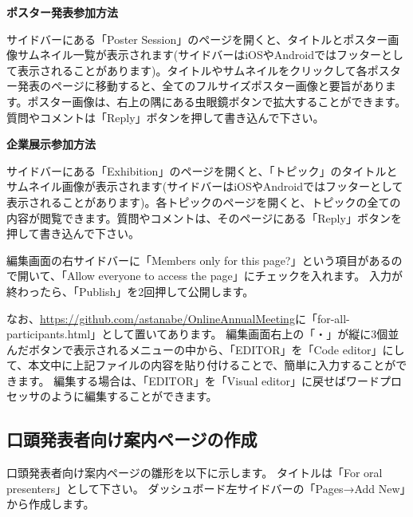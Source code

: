 \documentclass[titlepage,10pt,a4paper,uplatex]{jsbook}
\newenvironment{content}{\begin{shaded}\vspace{-1em}\raggedright\ttfamily\footnotesize\setlength{\baselineskip}{1.4em}}{\end{shaded}\vspace{-1em}}
\renewcommand{\textbf}[1]{{\bfseries\sffamily#1}}
\begin{document}
\begin{content}
\textbf{\Large ポスター発表参加方法}

サイドバーにある「Poster Session」のページを開くと、タイトルとポスター画像サムネイル一覧が表示されます(サイドバーはiOSやAndroidではフッターとして表示されることがあります)。タイトルやサムネイルをクリックして各ポスター発表のページに移動すると、全てのフルサイズポスター画像と要旨があります。ポスター画像は、右上の隅にある虫眼鏡ボタンで拡大することができます。質問やコメントは「Reply」ボタンを押して書き込んで下さい。

\textbf{\Large 企業展示参加方法}

サイドバーにある「Exhibition」のページを開くと、「トピック」のタイトルとサムネイル画像が表示されます(サイドバーはiOSやAndroidではフッターとして表示されることがあります)。各トピックのページを開くと、トピックの全ての内容が閲覧できます。質問やコメントは、そのページにある「Reply」ボタンを押して書き込んで下さい。
\end{content}

編集画面の右サイドバーに「Members only for this page?」という項目があるので開いて、「Allow everyone to access the page」にチェックを入れます。
入力が終わったら、「Publish」を2回押して公開します。

なお、\url{https://github.com/astanabe/OnlineAnnualMeeting}に「for-all-participants.html」として置いてあります。
編集画面右上の「・」が縦に3個並んだボタンで表示されるメニューの中から、「EDITOR」を「Code editor」にして、本文中に上記ファイルの内容を貼り付けることで、簡単に入力することができます。
編集する場合は、「EDITOR」を「Visual editor」に戻せばワードプロセッサのように編集することができます。

\subsection{口頭発表者向け案内ページの作成}

口頭発表者向け案内ページの雛形を以下に示します。
タイトルは「For oral presenters」として下さい。
ダッシュボード左サイドバーの「Pages→Add New」から作成します。
\end{document}
